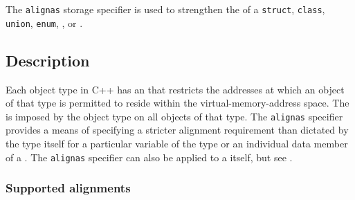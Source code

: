 
\setcounter{table}{0}
\setcounter{footnote}{0}
\setcounter{lstlisting}{0}

The \lstinline!alignas! storage specifier is used to strengthen
the  of a \lstinline!struct!, \lstinline!class!, \lstinline!union!, \lstinline!enum!, , or .

\subsection[Description]{Description}\label{description-alignas}

Each object type in C++ has an  that restricts the addresses at which an object of that type is permitted to reside within the virtual-memory-address space. The  is imposed by the object type on all objects of that type. The \lstinline!alignas! specifier provides a means of specifying a stricter alignment requirement than dictated by the type itself for a particular variable of the type or an individual data member of a . The \lstinline!alignas! specifier can also be applied to a  itself, but see .

\subsubsection[Supported alignments]{Supported alignments}\label{description-supported-alignments}

